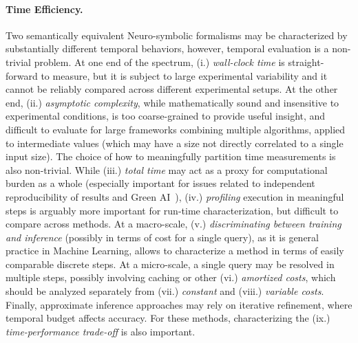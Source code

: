 \paragraph{Time Efficiency.} 
Two semantically equivalent Neuro-symbolic formalisms may be characterized by substantially different temporal behaviors, %
however, temporal evaluation is a non-trivial problem. 
At one end of the spectrum, (i.) \textit{wall-clock time} is straight-forward to measure, but it is subject to large experimental variability and it cannot be reliably compared across different experimental setups. 
At the other end, (ii.) \textit{asymptotic complexity}, while mathematically sound and insensitive to experimental conditions, is too coarse-grained to provide useful insight, and difficult to evaluate for large frameworks combining multiple algorithms, applied to intermediate values (which may have a size not directly correlated to a single input size).
%
The choice of how to meaningfully partition time measurements is also non-trivial.
While (iii.) \textit{total time} may act as a proxy for computational burden as a whole (especially important for issues related to independent reproducibility of results and Green AI~\cite{schwartz2020green}), (iv.) \textit{profiling} execution in meaningful steps is arguably more important for run-time characterization, but difficult to compare across methods.
At a macro-scale, (v.) \textit{discriminating between training and inference} (possibly in terms of cost for a single query), as it is general practice in Machine Learning, allows to characterize a method in terms of easily comparable discrete steps. %
At a micro-scale, a single query may be resolved in multiple steps, possibly involving caching or other (vi.) \textit{amortized costs}, which should be analyzed separately from (vii.) \textit{constant} and (viii.) \textit{variable costs}.
Finally, approximate inference approaches may rely on iterative refinement, where temporal budget affects accuracy. For these methods, characterizing the (ix.) \textit{time-performance trade-off} is also important.

